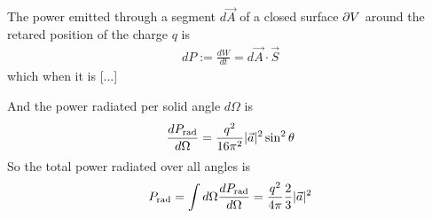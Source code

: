 The power emitted through a segment $d \vec{A}$ of a closed surface $\partial V$ around the retared position of the charge $q$ is
\begin{align*}
  dP := \frac{d W}{d t} = d \vec{A} \cdot \vec{S}
\end{align*}
which when it is
[...]


And the power radiated per solid angle $d \Omega$ is
\begin{align*}
  \frac{d P_{\text{rad}}}{d \Omega} = \frac{q^{2}}{16 \pi^{2}} \vert\vec{a}\vert^{2} \sin^{2} \theta
\end{align*}
So the total power radiated over all angles is
\begin{align*}
  P_{\text{rad}} = \int d \Omega \frac{d P_{\text{rad}}}{d \Omega}
  = \frac{q^{2}}{4 \pi} \frac{2}{3} \vert\vec{a}\vert^{2}
\end{align*}

